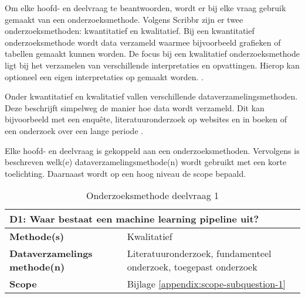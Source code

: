
\renewcommand{\arraystretch}{1.35} %

Om elke hoofd- en deelvraag te beantwoorden, wordt er bij elke vraag gebruik gemaakt van een onderzoeksmethode. Volgens Scribbr \cite{research-methods} zijn er twee onderzoeksmethoden: kwantitatief en kwalitatief. Bij een kwantitatief onderzoeksmethode wordt data verzameld waarmee bijvoorbeeld grafieken of tabellen gemaakt kunnen worden. De focus bij een kwalitatief onderzoeksmethode ligt bij het verzamelen van verschillende interpretaties en opvattingen. Hierop kan optioneel een eigen interpretaties op gemaakt worden. \cite{quantitative-vs-qualitative}.

Onder kwantitatief en kwalitatief vallen verschillende dataverzamelingsmethoden. Deze beschrijft simpelweg de manier hoe data wordt verzameld. Dit kan bijvoorbeeld met een enquête, literatuuronderzoek op websites en in boeken of een onderzoek over een lange periode \cite{quantitative-vs-qualitative}.

Elke hoofd- en deelvraag is gekoppeld aan een onderzoeksmethoden. Vervolgens is beschreven welk(e) dataverzamelingsmethode(n) wordt gebruikt met een korte toelichting. Daarnaast wordt op een hoog niveau de scope bepaald.

\begin{table}[hbt!]
  \centering
  \caption{Onderzoeksmethode deelvraag 1}
  \vspace*{.5\baselineskip}
  \begin{tabular}{|p{.215\linewidth}|p{.72\linewidth}|}
  \hline
  \multicolumn{2}{|p{.97\linewidth}|}{\textbf{D1: Waar bestaat een machine learning pipeline uit?}} \\ \hline
    \textbf{Methode(s)}&
      Kwalitatief
    \\ \hline
    \textbf{Dataverzamelings methode(n)}&
      Literatuuronderzoek, fundamenteel onderzoek, toegepast onderzoek
    \\ \hline
    \textbf{Scope}&
      Bijlage \ref{appendix:scope-subquestion-1}
    \\ \hline
  \end{tabular}
  \label{table:research-method-subquestion-1}
\end{table}

